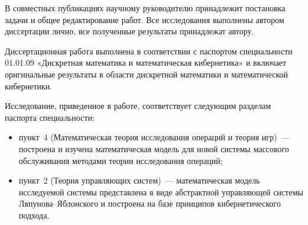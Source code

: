 {\contribution} В совместных публикациях научному руководителю принадлежит постановка задачи и общее редактирование работ. Все исследования выполнены автором диссертации лично, все полученные результаты принадлежат автору. 

{\passport} Диссертационная работа выполнена в соответствии с паспортом специальности 01.01.09 «Дискретная математика и математическая кибернетика» и включает оригинальные результаты в области дискретной математики и математической кибернетики. 

Исследование, приведенное в работе, соответствует следующим
разделам паспорта специальности: 
\begin{itemize}
    \item пункт~4 (Математическая теория исследования операций и теория игр)~--- построена и изучена математическая модель для новой системы массового обслуживания методами теории исследования операций;
    \item пункт~2 (Теория управляющих систем)~--- математическая модель исследуемой системы представлена в виде абстрактной управляющей системы Ляпунова--Яблонского и построена на базе принципов кибернетического подхода.
\end{itemize} 

